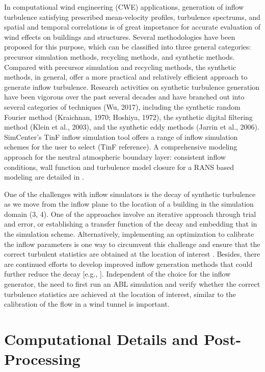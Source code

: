 In computational wind engineering (CWE) applications, generation of inflow turbulence satisfying prescribed mean-velocity profiles, turbulence spectrums, and spatial and temporal correlations is of great importance for accurate evaluation of wind effects on buildings and structures. Several methodologies have been proposed for this purpose, which can be classified into three general categories: precursor simulation methods, recycling methods, and synthetic methods. Compared with precursor simulation and recycling methods, the synthetic methods, in general, offer a more practical and relatively efficient approach to generate inflow turbulence. Research activities on synthetic turbulence generation have been vigorous over the past several decades and have branched out into several categories of techniques (Wu, 2017), including the synthetic random Fourier method (Kraichnan, 1970; Hoshiya, 1972), the synthetic digital filtering method (Klein et al., 2003), and the synthetic eddy methods (Jarrin et al., 2006). SimCenter's TinF inflow simulation tool offers a range of inflow simulation schemes for the user to select (TinF reference). A comprehensive modeling approach for the neutral atmospheric boundary layer: consistent inflow conditions, wall function and turbulence model closure for a RANS based modeling are detailed in \citep{parente2011comprehensive}.

One of the challenges with inflow simulators is the decay of synthetic turbulence as we move from the inflow plane to the location of a building in the simulation domain (3, 4). One of the approaches involve an iterative approach through trial and error, or establishing a transfer function of the decay and embedding that in the simulation scheme. Alternatively,  implementing an optimization to calibrate the inflow parameters is one way to circumvent this challenge and ensure that the correct turbulent statistics are obtained at the location of interest \citep{lamberti2018optimizing}. Besides, there are continued efforts to develop improved inflow generation methods that could further reduce the decay [e.g., \citep{bervida2020synthetic}]. Independent of the choice for the inflow generator, the need to first run an ABL simulation and verify whether the correct turbulence statistics are achieved at the location of interest, similar to the calibration of the flow in a wind tunnel is important.


\section{Computational Details and Post-Processing}
\label{sec:resp_cfd_wind_flow_modeling}

